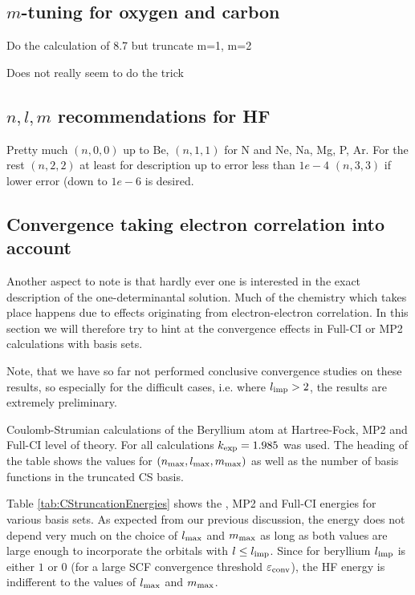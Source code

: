 \subsection{$m$-tuning for oxygen and carbon}
Do the calculation of 8.7 but truncate m=1, m=2

Does not really seem to do the trick

\subsection{$n,l,m$ recommendations for HF}
Pretty much $(n, 0, 0)$ up to Be, $(n, 1, 1)$ for N and Ne, Na, Mg, P, Ar.
For the rest $(n, 2, 2)$ at least for description up to error less than $1e-4$
$(n, 3, 3)$ if lower error (down to $1e-6$ is desired.

\subsection{Convergence taking electron correlation into account}
Another aspect to note is that hardly ever one is interested
in the exact description of the one-determinantal \HF solution.
Much of the chemistry which takes place happens due to effects originating
from electron-electron correlation.
In this section we will therefore try to hint at the convergence effects
in Full-CI or MP2 calculations with \CS basis sets.

Note, that we have so far not performed conclusive convergence studies
on these results, so especially for the difficult cases,
i.e. where $l_\text{imp} > 2$,
the results are extremely preliminary.

\begin{table}
	\centering
	
	\caption{Coulomb-Strumian calculations of the Beryllium atom
		at Hartree-Fock, MP2 and Full-CI level of theory.
		For all calculations $k_\text{exp} = 1.985$ was used.
		The heading of the table shows the values for
		$(n_\text{max}, l_\text{max}, m_\text{max})$ as well as the
		number of basis functions
		in the truncated CS basis.}
	\label{tab:CStruncationEnergies}
\end{table}

Table \vref{tab:CStruncationEnergies} shows the \HF, MP2 and
Full-CI energies for various \CS basis sets.
As expected from our previous discussion,
the \HF energy does not depend very much on the choice
of $l_\text{max}$ and $m_\text{max}$ as long as both values
are large enough to incorporate the orbitals with $l \leq l_\text{imp}$.
Since for beryllium $l_\text{imp}$ is either $1$ or $0$
(for a large SCF convergence threshold $\varepsilon_\text{conv}$),
the HF energy is indifferent
to the values of $l_\text{max}$ and $m_\text{max}$.

